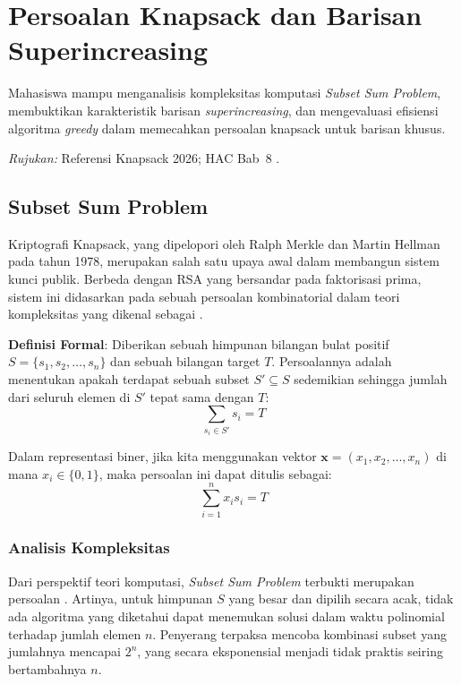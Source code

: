\section{Persoalan Knapsack dan Barisan Superincreasing}

\begin{subcpmk}
  \item Mahasiswa mampu menganalisis kompleksitas komputasi \textit{Subset Sum Problem}, membuktikan karakteristik barisan \textit{superincreasing}, dan mengevaluasi efisiensi algoritma \textit{greedy} dalam memecahkan persoalan knapsack untuk barisan khusus.
\end{subcpmk}

\noindent\textit{Rujukan:} Referensi Knapsack 2026; HAC Bab~8 \cite{hac_online}.

\subsection{Subset Sum Problem}

Kriptografi Knapsack, yang dipelopori oleh Ralph Merkle dan Martin Hellman pada tahun 1978, merupakan salah satu upaya awal dalam membangun sistem kunci publik. Berbeda dengan RSA yang bersandar pada faktorisasi prima, sistem ini didasarkan pada sebuah persoalan kombinatorial dalam teori kompleksitas yang dikenal sebagai .

\textbf{Definisi Formal}: Diberikan sebuah himpunan bilangan bulat positif $S = \{s_1, s_2, \dots, s_n\}$ dan sebuah bilangan target $T$. Persoalannya adalah menentukan apakah terdapat sebuah subset $S' \subseteq S$ sedemikian sehingga jumlah dari seluruh elemen di $S'$ tepat sama dengan $T$:
\begin{equation}
  \sum_{s_i \in S'} s_i = T
\end{equation}

Dalam representasi biner, jika kita menggunakan vektor $\mathbf{x} = (x_1, x_2, \dots, x_n)$ di mana $x_i \in \{0, 1\}$, maka persoalan ini dapat ditulis sebagai:
\begin{equation}
  \sum_{i=1}^n x_i s_i = T
\end{equation}

\subsubsection{Analisis Kompleksitas}
Dari perspektif teori komputasi, \textit{Subset Sum Problem} terbukti merupakan persoalan . Artinya, untuk himpunan $S$ yang besar dan dipilih secara acak, tidak ada algoritma yang diketahui dapat menemukan solusi dalam waktu polinomial terhadap jumlah elemen $n$. Penyerang terpaksa mencoba kombinasi subset yang jumlahnya mencapai $2^n$, yang secara eksponensial menjadi tidak praktis seiring bertambahnya $n$.

